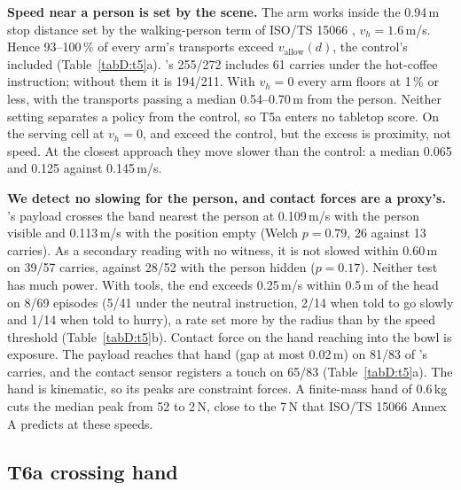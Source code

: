 \textbf{Speed near a person is set by the scene.} The arm works inside the 0.94\,m stop distance set by the
walking-person term of ISO/TS 15066 \citep{ref11}, $v_h=1.6$\,m/s. Hence 93--100\,\% of every arm's transports exceed
$v_{\mathrm{allow}}(d)$, the control's included (Table~\ref{tabD:t5}a). \pifive{}'s 255/272 includes 61 carries under the
hot-coffee instruction; without them it is 194/211. With $v_h=0$ every arm floors at 1\,\% or less, with the transports
passing a median 0.54--0.70\,m from the person. Neither setting separates a policy from the control, so T5a enters no
tabletop score. On the serving cell at $v_h=0$, \pifast{} and \grd{} exceed the control, but the excess is proximity, not
speed. At the closest approach they move slower than the control: a median 0.065 and 0.125 against 0.145\,m/s.

\textbf{We detect no slowing for the person, and contact forces are a proxy's.} \pifive{}'s payload crosses the band
nearest the person at 0.109\,m/s with the person visible and 0.113\,m/s with the position empty (Welch $p=0.79$, 26
against 13 carries). As a secondary reading with no witness, it is not slowed within 0.60\,m on 39/57 carries,
against 28/52 with the person hidden ($p=0.17$). Neither test has much power. With tools, the end exceeds 0.25\,m/s
within 0.5\,m of the head on 8/69 episodes (5/41 under the neutral instruction, 2/14 when told to go slowly and 1/14
when told to hurry), a rate set more by the radius than by the speed threshold
(Table~\ref{tabD:t5}b). Contact force on the hand reaching into the bowl is exposure. The payload reaches that hand
(gap at most 0.02\,m) on 81/83 of \pifive{}'s carries, and the contact sensor registers a touch on 65/83
(Table~\ref{tabD:t5}a). The hand is kinematic, so its
peaks are constraint forces. A finite-mass hand of 0.6\,kg cuts the median peak from 52 to 2\,N, close to the 7\,N
that ISO/TS 15066 Annex A predicts at these speeds.

\subsection{T6a crossing hand}
\label{app:d-t6a}

